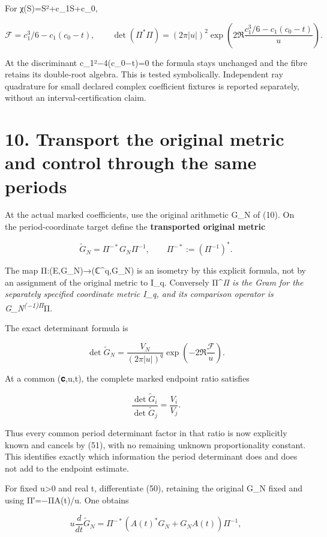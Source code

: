 \documentclass[
  11pt,
]{article}
\begin{document}
For χ(S)=S²+c\_1S+c\_0,

\[
\mathcal F=c_1^3/6-c_1(c_0-t),
\qquad
\det(\Pi^*\Pi)
 =(2\pi|u|)^2
 \exp\!\left(2\Re\frac{c_1^3/6-c_1(c_0-t)}u\right).
\tag{49}
\]

At the discriminant c\_1²−4(c\_0−t)=0 the formula stays unchanged and
the fibre retains its double-root algebra. This is tested symbolically.
Independent ray quadrature for small declared complex coefficient
fixtures is reported separately, without an interval-certification
claim.

\section{10. Transport the original metric and control through the same
periods}\label{transport-the-original-metric-and-control-through-the-same-periods}

At the actual marked coefficients, use the original arithmetic G\_N of
(10). On the period-coordinate target define the \textbf{transported
original metric}

\[
\widetilde G_N=\Pi^{-*}G_N\Pi^{-1},
\qquad
\Pi^{-*}:=(\Pi^{-1})^*.
\tag{50}
\]

The map Π:(E,G\_N)→(ℂ\^{}q,\widetilde G\_N) is an isometry by this
explicit formula, not by an assignment of the original metric to I\_q.
Conversely Π\^{}\emph{Π is the Gram for the separately specified
coordinate metric I\_q, and its comparison operator is
G\_N\textsuperscript{(−1)Π}}Π.

The exact determinant formula is

\[
\boxed{
\det\widetilde G_N
 =\frac{V_N}{(2\pi|u|)^q}
 \exp\!\left(-2\Re\frac{\mathcal F}u\right).
}
\tag{51}
\]

At a common (𝐜,u,t), the complete marked endpoint ratio satisfies

\[
\boxed{
\frac{\det\widetilde G_i}{\det\widetilde G_j}
 =\frac{V_i}{V_j}.
}
\tag{52}
\]

Thus every common period determinant factor in that ratio is now
explicitly known and cancels by (51), with no remaining unknown
proportionality constant. This identifies exactly which information the
period determinant does and does not add to the endpoint estimate.

For fixed u\textgreater0 and real t, differentiate (50), retaining the
original G\_N fixed and using Π′=−ΠA(t)/u. One obtains

\[
u\frac{d}{dt}\widetilde G_N
 =\Pi^{-*}(A(t)^*G_N+G_NA(t))\Pi^{-1},
\tag{53}
\]
\end{document}
